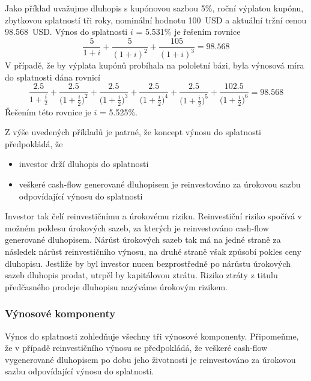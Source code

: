 \documentclass[a4paper]{book}
\begin{document}
Jako příklad uvažujme dluhopis s kupónovou sazbou 5\%, roční výplatou kupónu, zbytkovou splatností tři roky, nominální hodnotu 100~USD a aktuální tržní cenou 98.568~USD. Výnos do splatnosti $i$ = 5.531\% je řešením rovnice
\begin{equation*}
\frac{5}{1 + i} + \frac{5}{(1 + i)^2} + \frac{105}{(1 + i)^3} = 98.568
\end{equation*}
V případě, že by výplata kupónů probíhala na pololetní bázi, byla výnosová míra do splatnosti dána rovnicí
\begin{equation*}
\frac{2.5}{1 + \frac{i}{2}} + \frac{2.5}{\big(1 + \frac{i}{2}\big)^2} + \frac{2.5}{\big(1 + \frac{i}{2}\big)^3} + \frac{2.5}{\big(1 + \frac{i}{2}\big)^4} + \frac{2.5}{\big(1 + \frac{i}{2}\big)^5} + \frac{102.5}{\big(1 + \frac{i}{2}\big)^6}= 98.568
\end{equation*}
Řešením této rovnice je $i$ = 5.525\%. 

Z výše uvedených příkladů je patrné, že koncept výnosu do splatnosti předpokládá, že
\begin{itemize}
\item investor drží dluhopis do splatnosti
\item veškeré cash-flow generované dluhopisem je reinvestováno za úrokovou sazbu odpovídající výnosu do splatnosti
\end{itemize}
Investor tak čelí reinvestičnímu a úrokovému riziku. Reinvestiční riziko spočívá v možném poklesu úrokových sazeb, za kterých je reinvestováno cash-flow generované dluhopisem. Nárůst úrokových sazeb tak má na jedné straně za následek nárůst reinvestičního výnosu, na druhé straně však způsobí pokles ceny dluhopisu. Jestliže by byl investor nucen bezprostředně po nárůstu úrokových sazeb dluhopis prodat, utrpěl by kapitálovou ztrátu. Riziko ztráty z titulu předčasného prodeje dluhopisu nazýváme úrokovým rizikem.

\subsubsection{Výnosové komponenty}

Výnos do splatnosti zohledňuje všechny tři výnosové komponenty. Připomeňme, že v případě reinvestičního výnosu se předpokládá, že veškeré cash-flow vygenerované dluhopisem po dobu jeho životnosti je reinvestováno za úrokovou sazbu odpovídající výnosu do splatnosti.
\end{document}
